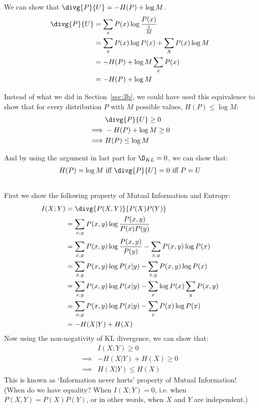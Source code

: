 \documentclass{article}
\begin{document}
\subsection{}
We can show that \(\divg{P}{U} = - H(P) + \log M\).
\begin{align*}
\divg{P}{U} &= \sum_{x} P(x) \log \frac{P(x)}{\frac{1}{M}}\\
&= \sum_{x} P(x) \log P(x) + \sum_{X} P(x) \log M\\
&= - H(P) + \log M \sum_x P(x)\\
&= -H(P) + \log M
\end{align*}

Instead of what we did in Section~\ref{sec:3b}, we could have used this equivalence to show that for every distribution \(P\) with \(M\) possible values, \(H(P) \le \log M\):
\begin{align*}
& \divg{P}{U} \ge 0\\
\implies & -H(P) + \log M \ge 0\\
\implies & H(P) \le \log M
\end{align*}

And by using the argument in last part for \({\D}_{KL} = 0\), we can show that:
\begin{align*}
H(P) = \log M \text{ iff } \divg{P}{U} = 0 \text{ iff } P = U
\end{align*}

\subsection{}
\label{sec:3f}
First we show the following property of Mutual Information and Entropy:
\begin{align*}
I(X; Y) &= \divg{P(X, Y)}{P(X)P(Y)}\\
&= \sum_{x, y} P(x, y) \log \frac{P(x, y)}{P(x)P(y)}\\
&= \sum_{x, y} P(x, y) \log \frac{P(x, y)}{P(y)} - \sum_{x, y} P(x, y) \log P(x)\\
&= \sum_{x, y} P(x, y) \log P(x|y) - \sum_{x, y} P(x, y) \log P(x)\\
&= \sum_{x, y} P(x, y) \log P(x|y) - \sum_{x} \log P(x) \sum_{y} P(x, y)\\
&= \sum_{x, y} P(x, y) \log P(x|y) - \sum_{x} P(x) \log P(x)\\
&= - H(X|Y) + H(X)
\end{align*}
Now using the non-negativity of KL divergence, we can show that:
\begin{align*}
& I(X; Y) \ge 0\\
\implies & - H(X|Y) + H(X) \ge 0\\
\implies & H(X|Y) \le H(X)
\end{align*}
This is known as `Information never hurts' property of Mutual Information!\\
(When do we have equality? When \(I(X;Y) = 0\), i.e. when \(P(X, Y) = P(X)P(Y)\), or in other words, when \(X\) and \(Y\) are independent.)
\end{document}
